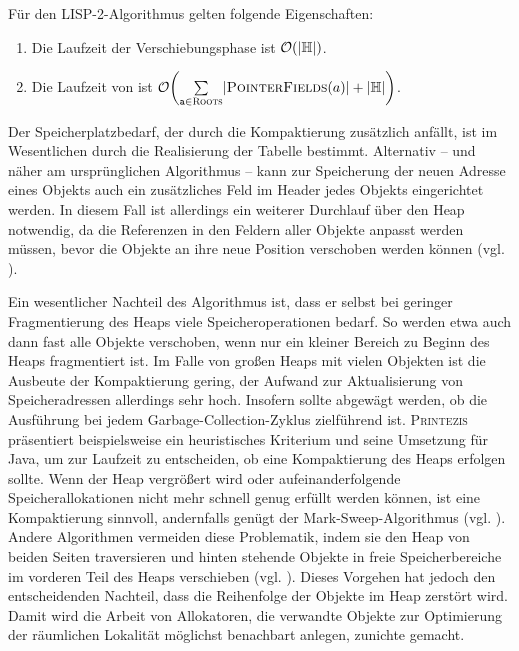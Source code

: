 \begin{mybox}
\begin{satz}
	Für den LISP-2-Algorithmus gelten folgende Eigenschaften:
	\begin{enumerate}[(1)]
		\item Die Laufzeit der Verschiebungsphase ist $\mathcal{O}(|\mathbb{H}|)$.
		\item Die Laufzeit von  ist $\oh\enb{\sum\limits_{\Var{a} \in \Roots}^{} \abs{\Fields(a)} + \abs{\HeapSize}}$.
	\end{enumerate}
\end{satz}
\end{mybox}

Der Speicherplatzbedarf, der durch die Kompaktierung zusätzlich anfällt, ist im Wesentlichen durch die Realisierung der Tabelle  bestimmt.
Alternativ -- und näher am ursprünglichen Algorithmus -- kann zur Speicherung der neuen Adresse eines Objekts auch ein zusätzliches Feld im Header jedes Objekts eingerichtet werden.
In diesem Fall ist allerdings ein weiterer Durchlauf über den Heap notwendig, da die Referenzen in den Feldern aller Objekte anpasst werden müssen, bevor die Objekte an ihre neue Position verschoben werden können (vgl. \cite[S. 16]{morikawa2013}).

Ein wesentlicher Nachteil des Algorithmus ist, dass er selbst bei geringer Fragmentierung des Heaps viele Speicheroperationen bedarf.
So werden etwa auch dann fast alle Objekte verschoben, wenn nur ein kleiner Bereich zu Beginn des Heaps fragmentiert ist.
Im Falle von großen Heaps mit vielen Objekten ist die Ausbeute der Kompaktierung gering, der Aufwand zur Aktualisierung von Speicheradressen allerdings sehr hoch.
Insofern sollte abgewägt werden, ob die Ausführung bei jedem Garbage-Collection-Zyklus zielführend ist.
\textsc{Printezis} präsentiert beispielsweise ein heuristisches Kriterium und seine Umsetzung für Java, um zur Laufzeit zu entscheiden, ob eine Kompaktierung des Heaps erfolgen sollte.
Wenn der Heap vergrößert wird oder aufeinanderfolgende Speicherallokationen nicht mehr schnell genug erfüllt werden können, ist eine Kompaktierung sinnvoll, andernfalls genügt der Mark-Sweep-Algorithmus (vgl. \cite[Kap. 3.4]{printezis2001}).
Andere Algorithmen vermeiden diese Problematik, indem sie den Heap von beiden Seiten traversieren und hinten stehende Objekte in freie Speicherbereiche im vorderen Teil des Heaps verschieben (vgl. \cite[S. 32f]{handbook}).
Dieses Vorgehen hat jedoch den entscheidenden Nachteil, dass die Reihenfolge der Objekte im Heap zerstört wird.
Damit wird die Arbeit von Allokatoren, die verwandte Objekte zur Optimierung der räumlichen Lokalität möglichst benachbart anlegen, zunichte gemacht.


